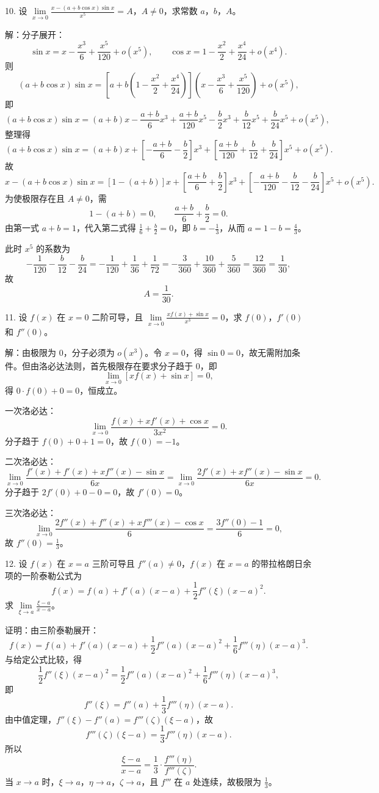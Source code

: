 10. 设 \(\lim\limits_{x\to 0}\frac{x-(a+b\cos x)\sin x}{x^{5}}=A\)，\(A\neq 0\)，求常数 \(a\)，\(b\)，\(A\)。

解：分子展开：
\[ \sin x=x-\frac{x^{3}}{6}+\frac{x^{5}}{120}+o(x^{5}),\qquad \cos x=1-\frac{x^{2}}{2}+\frac{x^{4}}{24}+o(x^{4}). \]
则
\[ (a+b\cos x)\sin x=\left[a+b\left(1-\frac{x^{2}}{2}+\frac{x^{4}}{24}\right)\right]\left(x-\frac{x^{3}}{6}+\frac{x^{5}}{120}\right)+o(x^{5}), \]
即
\[ (a+b\cos x)\sin x=(a+b)x-\frac{a+b}{6}x^{3}+\frac{a+b}{120}x^{5}-\frac{b}{2}x^{3}+\frac{b}{12}x^{5}+\frac{b}{24}x^{5}+o(x^{5}), \]
整理得
\[ (a+b\cos x)\sin x=(a+b)x+\left[-\frac{a+b}{6}-\frac{b}{2}\right]x^{3}+\left[\frac{a+b}{120}+\frac{b}{12}+\frac{b}{24}\right]x^{5}+o(x^{5}). \]
故
\[ x-(a+b\cos x)\sin x=[1-(a+b)]x+\left[\frac{a+b}{6}+\frac{b}{2}\right]x^{3}+\left[-\frac{a+b}{120}-\frac{b}{12}-\frac{b}{24}\right]x^{5}+o(x^{5}). \]
为使极限存在且 \(A\neq 0\)，需
\[ 1-(a+b)=0,\qquad \frac{a+b}{6}+\frac{b}{2}=0. \]
由第一式 \(a+b=1\)，代入第二式得 \(\frac{1}{6}+\frac{b}{2}=0\)，即 \(b=-\frac{1}{3}\)，从而 \(a=1-b=\frac{4}{3}\)。

此时 \(x^{5}\) 的系数为
\[ -\frac{1}{120}-\frac{b}{12}-\frac{b}{24}=-\frac{1}{120}+\frac{1}{36}+\frac{1}{72}=-\frac{3}{360}+\frac{10}{360}+\frac{5}{360}=\frac{12}{360}=\frac{1}{30}, \]
故
\[ A=\frac{1}{30}. \]

11. 设 \(f(x)\) 在 \(x=0\) 二阶可导，且 \(\lim\limits_{x\to 0}\frac{xf(x)+\sin x}{x^{3}}=0\)，求 \(f(0)\)，\(f'(0)\) 和 \(f''(0)\)。

解：由极限为 \(0\)，分子必须为 \(o(x^{3})\)。令 \(x=0\)，得 \(\sin 0=0\)，故无需附加条件。但由洛必达法则，首先极限存在要求分子趋于 \(0\)，即
\[ \lim_{x\to 0}[xf(x)+\sin x]=0, \]
得 \(0\cdot f(0)+0=0\)，恒成立。

一次洛必达：
\[ \lim_{x\to 0}\frac{f(x)+xf'(x)+\cos x}{3x^{2}}=0. \]
分子趋于 \(f(0)+0+1=0\)，故 \(f(0)=-1\)。

二次洛必达：
\[ \lim_{x\to 0}\frac{f'(x)+f'(x)+xf''(x)-\sin x}{6x}=\lim_{x\to 0}\frac{2f'(x)+xf''(x)-\sin x}{6x}=0. \]
分子趋于 \(2f'(0)+0-0=0\)，故 \(f'(0)=0\)。

三次洛必达：
\[ \lim_{x\to 0}\frac{2f''(x)+f''(x)+xf'''(x)-\cos x}{6}=\frac{3f''(0)-1}{6}=0, \]
故 \(f''(0)=\frac{1}{3}\)。

12. 设 \(f(x)\) 在 \(x=a\) 三阶可导且 \(f''(a)\neq 0\)，\(f(x)\) 在 \(x=a\) 的带拉格朗日余项的一阶泰勒公式为
\[ f(x)=f(a)+f'(a)(x-a)+\frac{1}{2}f''(\xi)(x-a)^{2}. \]
求 \(\lim\limits_{\xi\to a}\frac{\xi-a}{x-a}\)。

证明：由三阶泰勒展开：
\[ f(x)=f(a)+f'(a)(x-a)+\frac{1}{2}f''(a)(x-a)^{2}+\frac{1}{6}f'''(\eta)(x-a)^{3}. \]
与给定公式比较，得
\[ \frac{1}{2}f''(\xi)(x-a)^{2}=\frac{1}{2}f''(a)(x-a)^{2}+\frac{1}{6}f'''(\eta)(x-a)^{3}, \]
即
\[ f''(\xi)=f''(a)+\frac{1}{3}f'''(\eta)(x-a). \]
由中值定理，\(f''(\xi)-f''(a)=f'''(\zeta)(\xi-a)\)，故
\[ f'''(\zeta)(\xi-a)=\frac{1}{3}f'''(\eta)(x-a). \]
所以
\[ \frac{\xi-a}{x-a}=\frac{1}{3}\cdot\frac{f'''(\eta)}{f'''(\zeta)}. \]
当 \(x\to a\) 时，\(\xi\to a\)，\(\eta\to a\)，\(\zeta\to a\)，且 \(f'''\) 在 \(a\) 处连续，故极限为 \(\frac{1}{3}\)。


